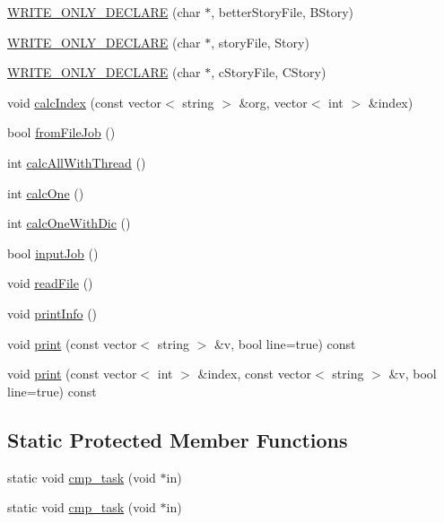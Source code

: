 \begin{DoxyCompactItemize}
\item 
\hyperlink{class_a_p_p_af01ec83f01316bfff6a546ea193bd78d}{W\+R\+I\+T\+E\+\_\+\+O\+N\+L\+Y\+\_\+\+D\+E\+C\+L\+A\+R\+E} (char $\ast$, better\+Story\+File, B\+Story)
\item 
\hyperlink{class_a_p_p_adf8e3638cc483b9f8835f22c3cefa1d8}{W\+R\+I\+T\+E\+\_\+\+O\+N\+L\+Y\+\_\+\+D\+E\+C\+L\+A\+R\+E} (char $\ast$, story\+File, Story)
\item 
\hyperlink{class_a_p_p_a3f492a4caa57a2cb5d2d8ef4b2171a26}{W\+R\+I\+T\+E\+\_\+\+O\+N\+L\+Y\+\_\+\+D\+E\+C\+L\+A\+R\+E} (char $\ast$, c\+Story\+File, C\+Story)
\item 
void \hyperlink{class_a_p_p_a329336a84831c48108262bd320944871}{calc\+Index} (const vector$<$ string $>$ \&org, vector$<$ int $>$ \&index)
\item 
bool \hyperlink{class_a_p_p_ab13dec33bbb35a260982031798af0566}{from\+File\+Job} ()
\item 
int \hyperlink{class_a_p_p_a2dfbe5c80d4997895be73f5134b1806e}{calc\+All\+With\+Thread} ()
\item 
int \hyperlink{class_a_p_p_adf4d3aa3c292a553ba12ad4d4adb8ed8}{calc\+One} ()
\item 
int \hyperlink{class_a_p_p_a6d7ca0077e251d59d0abba39ccfacd0a}{calc\+One\+With\+Dic} ()
\item 
bool \hyperlink{class_a_p_p_abe394dad8124de2b16ca6fa15fc1031f}{input\+Job} ()
\item 
void \hyperlink{class_a_p_p_a28855295319df5522e17b396e98a0134}{read\+File} ()
\item 
void \hyperlink{class_a_p_p_a7d0e3d031b5842c00910a734da39d027}{print\+Info} ()
\item 
void \hyperlink{class_a_p_p_aef7c54038f2695d4993d2f43ae535f1e}{print} (const vector$<$ string $>$ \&v, bool line=true) const 
\item 
void \hyperlink{class_a_p_p_a79b3882decc18c22c53d7bf9c1738201}{print} (const vector$<$ int $>$ \&index, const vector$<$ string $>$ \&v, bool line=true) const 
\end{DoxyCompactItemize}
\subsection*{Static Protected Member Functions}
\begin{DoxyCompactItemize}
\item 
static void \hyperlink{class_a_p_p_a643d26fb5b685c7a1a9ca0f907722241}{cmp\+\_\+task} (void $\ast$in)
\item 
static void \hyperlink{class_a_p_p_abdbe780dfdb0886e27c6744df079f38a}{cmp\+\_\+task} (void $\ast$in)
\end{DoxyCompactItemize}
